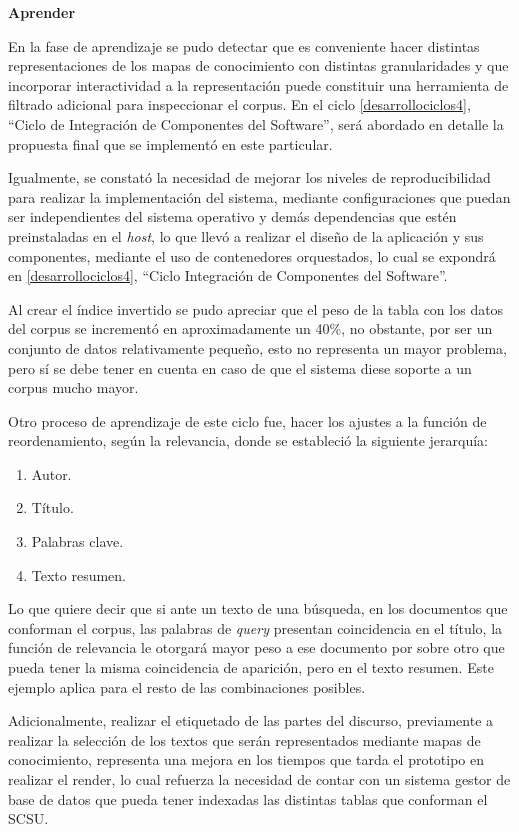 \documentclass[
  12pt,
  openany]{book}
\begin{document}
\textbf{Aprender}

En la fase de aprendizaje se pudo detectar que es conveniente hacer distintas representaciones de los mapas de conocimiento con distintas granularidades y que incorporar interactividad a la representación puede constituir una herramienta de filtrado adicional para inspeccionar el corpus. En el ciclo \ref{desarrollociclos4}, ``Ciclo de Integración de Componentes del Software'', será abordado en detalle la propuesta final que se implementó en este particular.

Igualmente, se constató la necesidad de mejorar los niveles de reproducibilidad para realizar la implementación del sistema, mediante configuraciones que puedan ser independientes del sistema operativo y demás dependencias que estén preinstaladas en el \emph{host}, lo que llevó a realizar el diseño de la aplicación y sus componentes, mediante el uso de contenedores orquestados, lo cual se expondrá en \ref{desarrollociclos4}, ``Ciclo Integración de Componentes del Software''.

Al crear el índice invertido se pudo apreciar que el peso de la tabla con los datos del corpus se incrementó en aproximadamente un 40\%, no obstante, por ser un conjunto de datos relativamente pequeño, esto no representa un mayor problema, pero sí se debe tener en cuenta en caso de que el sistema diese soporte a un corpus mucho mayor.

Otro proceso de aprendizaje de este ciclo fue, hacer los ajustes a la función de reordenamiento, según la relevancia, donde se estableció la siguiente jerarquía:

\begin{enumerate}
\def\labelenumi{\arabic{enumi}.}
\item
  Autor.
\item
  Título.
\item
  Palabras clave.
\item
  Texto resumen.
\end{enumerate}

Lo que quiere decir que si ante un texto de una búsqueda, en los documentos que conforman el corpus, las palabras de \emph{query} presentan coincidencia en el título, la función de relevancia le otorgará mayor peso a ese documento por sobre otro que pueda tener la misma coincidencia de aparición, pero en el texto resumen. Este ejemplo aplica para el resto de las combinaciones posibles.

Adicionalmente, realizar el etiquetado de las partes del discurso, previamente a realizar la selección de los textos que serán representados mediante mapas de conocimiento, representa una mejora en los tiempos que tarda el prototipo en realizar el render, lo cual refuerza la necesidad de contar con un sistema gestor de base de datos que pueda tener indexadas las distintas tablas que conforman el SCSU.
\end{document}
